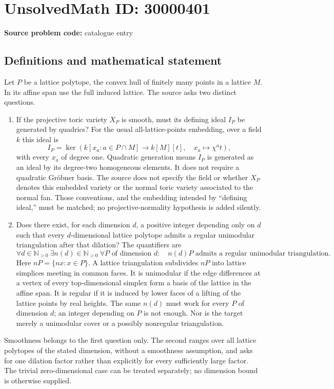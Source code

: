 \documentclass[11pt]{article}
\newcommand{\N}{\mathbb{N}}
\begin{document}
\section*{UnsolvedMath ID: 30000401}
\textbf{Source problem code:} catalogue entry
\subsection{Definitions and mathematical statement}
Let $P$ be a lattice polytope, the convex hull of finitely many points in a lattice $M$. In its affine span use the full induced lattice. The source asks two distinct questions.

\begin{enumerate}
\item If the projective toric variety $X_P$ is smooth, must its defining ideal $I_P$ be generated by quadrics? For the usual all-lattice-points embedding, over a field $k$ this ideal is
\[
 I_P=\ker\!\left(k[x_a:a\in P\cap M]\longrightarrow k[M][t],
                  \quad x_a\longmapsto\chi^a t\right),
\]
with every $x_a$ of degree one. Quadratic generation means $I_P$ is generated as an ideal by its degree-two homogeneous elements. It does not require a quadratic Gr\"obner basis. The source does not specify the field or whether $X_P$ denotes this embedded variety or the normal toric variety associated to the normal fan. Those conventions, and the embedding intended by ``defining ideal,'' must be matched; no projective-normality hypothesis is added silently.
\item Does there exist, for each dimension $d$, a positive integer depending only on $d$ such that every $d$-dimensional lattice polytope admits a regular unimodular triangulation after that dilation? The quantifiers are
\[
 \forall d\in\N_{>0}\ \exists n(d)\in\N_{>0}\
 \forall P\text{ of dimension }d:\quad
 n(d)P\text{ admits a regular unimodular triangulation}.
\]
Here $nP=\{nx:x\in P\}$. A lattice triangulation subdivides $nP$ into lattice simplices meeting in common faces. It is unimodular if the edge differences at a vertex of every top-dimensional simplex form a basis of the lattice in the affine span. It is regular if it is induced by lower faces of a lifting of the lattice points by real heights. The same $n(d)$ must work for every $P$ of dimension $d$; an integer depending on $P$ is not enough. Nor is the target merely a unimodular cover or a possibly nonregular triangulation.
\end{enumerate}

Smoothness belongs to the first question only. The second ranges over all lattice polytopes of the stated dimension, without a smoothness assumption, and asks for one dilation factor rather than explicitly for every sufficiently large factor. The trivial zero-dimensional case can be treated separately; no dimension bound is otherwise supplied.
\end{document}
